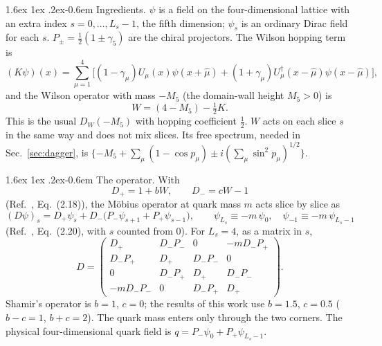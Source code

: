 \documentclass[11pt,a4paper]{article}
\makeatletter
\renewcommand\paragraph{\@startsection{paragraph}{4}{\z@}%
  {1.6ex \@plus 1ex \@minus .2ex}{-0.6em}%
  {\normalfont\normalsize\itshape}}
\numberwithin{equation}{section}
\newcommand{\dg}{^{\dagger}}
\newcommand{\Pp}{P_{+}}
\newcommand{\Pm}{P_{-}}
\makeatother
\begin{document}
\paragraph{Ingredients.} $\psi$ is a field on the four-dimensional lattice with an extra
index $s=0,\dots,L_s-1$, the fifth dimension; $\psi_s$ is an ordinary Dirac field for each
$s$. $P_\pm=\tfrac12(1\pm\gamma_5)$ are the chiral projectors. The Wilson hopping term is
\begin{equation}
(K\psi)(x)=\sum_{\mu=1}^{4}\Big[(1-\gamma_\mu)U_\mu(x)\psi(x+\hat\mu)
+(1+\gamma_\mu)U_\mu\dg(x-\hat\mu)\psi(x-\hat\mu)\Big],
\end{equation}
and the Wilson operator with mass $-M_5$ (the domain-wall height $M_5>0$) is
\begin{equation}
W=(4-M_5)-\tfrac12K .
\label{eq:W}
\end{equation}
This is the usual $D_W(-M_5)$ with hopping coefficient $\tfrac12$. $W$ acts on each slice
$s$ in the same way and does not mix slices. Its free spectrum, needed in
Sec.~\ref{sec:dagger}, is $\{-M_5+\sum_\mu(1-\cos p_\mu)\pm i(\sum_\mu\sin^2p_\mu)^{1/2}\}$.

\paragraph{The operator.} With
\begin{equation}
D_+=1+bW,\qquad D_-=cW-1
\label{eq:Dpm}
\end{equation}
(Ref.~\cite{BNO}, Eq.~(2.18)), the M\"obius operator at quark mass $m$ acts slice by slice as
\begin{equation}
(D\psi)_s=D_+\psi_s+D_-\big(\Pm\psi_{s+1}+\Pp\psi_{s-1}\big),\qquad
\psi_{L_s}\equiv-m\,\psi_0,\quad \psi_{-1}\equiv-m\,\psi_{L_s-1}
\label{eq:Dslice}
\end{equation}
(Ref.~\cite{BNO}, Eq.~(2.20), with $s$ counted from $0$). For $L_s=4$, as a matrix in $s$,
\begin{equation}
D=\begin{pmatrix}
D_+ & D_-\Pm & 0 & -mD_-\Pp\\
D_-\Pp & D_+ & D_-\Pm & 0\\
0 & D_-\Pp & D_+ & D_-\Pm\\
-mD_-\Pm & 0 & D_-\Pp & D_+
\end{pmatrix}.
\label{eq:Dmatrix}
\end{equation}
Shamir's operator is $b=1$, $c=0$; the results of this work use $b=1.5$, $c=0.5$
($b-c=1$, $b+c=2$). The quark mass enters only through the two corners. The physical
four-dimensional quark field is $q=\Pm\psi_0+\Pp\psi_{L_s-1}$.
\end{document}
